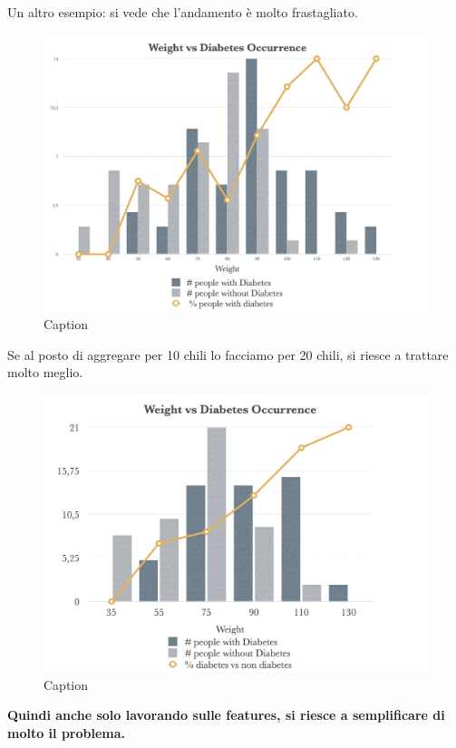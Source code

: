 Un altro esempio: si vede che l'andamento è molto frastagliato.
\begin{figure}[!h]
    \centering
    \includegraphics[scale=0.5]{images/diabetes0.png}
    \caption{Caption}
    \label{fig:enter-label}
\end{figure}

Se al posto di aggregare per 10 chili lo facciamo per 20 chili, si riesce a trattare molto meglio.
\begin{figure}[!h]
    \centering
    \includegraphics[scale=0.5]{images/diabetes1.png}
    \caption{Caption}
    \label{fig:enter-label}
\end{figure}

\textbf{Quindi anche solo lavorando sulle features, si riesce a semplificare di molto il problema.}
